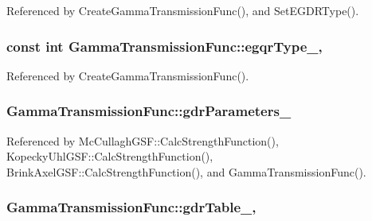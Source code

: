 Referenced by Create\-Gamma\-Transmission\-Func(), and Set\-E\-G\-D\-R\-Type().

\hypertarget{classGammaTransmissionFunc_a04f3aade1b8c0a2d707fb67028c6fe79}{
\subsubsection[{egqr\-Type\-\_\-}]{\setlength{\rightskip}{0pt plus 5cm}const int Gamma\-Transmission\-Func\-::egqr\-Type\-\_\hspace{0.3cm}{\ttfamily [static]}, {\ttfamily [protected]}}}\label{classGammaTransmissionFunc_a04f3aade1b8c0a2d707fb67028c6fe79}


Referenced by Create\-Gamma\-Transmission\-Func().

\hypertarget{classGammaTransmissionFunc_a2fc3e55f03a93237061ef5c72077e007}{
\subsubsection[{gdr\-Parameters\-\_\-}]{ Gamma\-Transmission\-Func\-::gdr\-Parameters\-\_\-\hspace{0.3cm}{\ttfamily [protected]}}}\label{classGammaTransmissionFunc_a2fc3e55f03a93237061ef5c72077e007}


Referenced by Mc\-Cullagh\-G\-S\-F\-::\-Calc\-Strength\-Function(), Kopecky\-Uhl\-G\-S\-F\-::\-Calc\-Strength\-Function(), Brink\-Axel\-G\-S\-F\-::\-Calc\-Strength\-Function(), and Gamma\-Transmission\-Func().

\hypertarget{classGammaTransmissionFunc_a1ce4515fa2b9343208d5a419b3a8a486}{
\subsubsection[{gdr\-Table\-\_\-}]{ Gamma\-Transmission\-Func\-::gdr\-Table\-\_\-\hspace{0.3cm}{\ttfamily [static]}, {\ttfamily [protected]}}}\label{classGammaTransmissionFunc_a1ce4515fa2b9343208d5a419b3a8a486}


